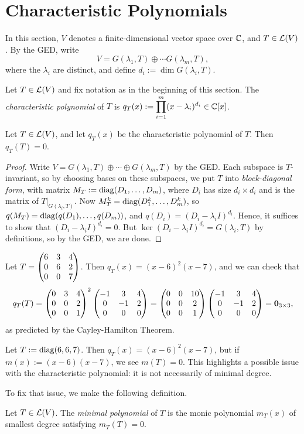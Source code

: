 \documentclass{article}
\begin{document}
\section{Characteristic Polynomials}
In this section, $V$ denotes a finite-dimensional vector space over $\mathbb C$, and $T\in\mathcal L(V)$. By the GED, write
$$V = G(\lambda_1, T) \oplus \cdots G(\lambda_m, T),$$
where the $\lambda_i$ are distinct, and define $d_i := \dim G(\lambda_i, T)$.
\newpage
\begin{definition}
Let $T\in\mathcal L(V)$ and fix notation as in the beginning of this section. The \textit{characteristic polynomial} of $T$ is $q_T(x) := \displaystyle\prod_{i=1}^m (x - \lambda_i)^{d_i} \in \mathbb C[x]$.
\end{definition}
\begin{theorem}
Let $T\in\mathcal L(V)$, and let $q_T(x)$ be the characteristic polynomial of $T$. Then $q_T(T) = 0$.
\end{theorem}
\begin{proof}
Write $V = G(\lambda_1, T)\oplus \cdots\oplus G(\lambda_m, T)$ by the GED. Each subspace is $T$-invariant, so by choosing bases on these subspaces, we put $T$ into \textit{block-diagonal form}, with matrix $M_T := \operatorname{diag}(D_1, \ldots, D_m)$, where $D_i$ has size $d_i\times d_i$ and is the matrix of $T|_{G(\lambda_i, T)}$. Now $M_T^k = \operatorname{diag}(D_1^k,\ldots, D_m^k)$, so $q(M_T) = \operatorname{diag}(q(D_1), \ldots, q(D_m))$, and $q(D_i) = (D_i - \lambda_i I)^{d_i}$. Hence, it suffices to show that $(D_i - \lambda_iI)^{d_i} = 0$. But $\ker(D_i - \lambda_iI)^{d_i} = G(\lambda_i, T)$ by definitions, so by the GED, we are done. 
\end{proof}
\begin{example}
Let $T = \begin{pmatrix}6 & 3 & 4 \\ 0 & 6 & 2 \\ 0 & 0 & 7 \end{pmatrix}$. Then $q_T(x) = (x-6)^2 (x-7)$, and we can check that
$$q_T(T) = \begin{pmatrix}0 & 3 & 4 \\ 0 & 0 & 2 \\ 0 & 0 & 1 \end{pmatrix}^2 \begin{pmatrix}-1 & 3 & 4 \\ 0 & -1 & 2 \\ 0 & 0 & 0 \end{pmatrix} = \begin{pmatrix}0 & 0 & 10 \\ 0 & 0 & 2 \\ 0 & 0 & 1 \end{pmatrix} \begin{pmatrix}-1 & 3 & 4 \\ 0 & -1 & 2 \\ 0 & 0 & 0 \end{pmatrix} = \mathbf 0_{3\times 3},$$
as predicted by the Cayley-Hamilton Theorem.
\end{example}
\begin{example}
Let $T := \operatorname{diag}(6,6,7)$. Then $q_T(x) = (x-6)^2 (x-7)$, but if $m(x) := (x-6)(x-7)$, we see $m(T) = 0$. This highlights a possible issue with the characteristic polynomial: it is not necessarily of minimal degree.
\end{example}
To fix that issue, we make the following definition.
\begin{definition}
Let $T\in\mathcal L(V)$. The \textit{minimal polynomial} of $T$ is the monic polynomial $m_T(x)$ of smallest degree satisfying $m_T(T) = 0$.
\end{definition}
\end{document}
